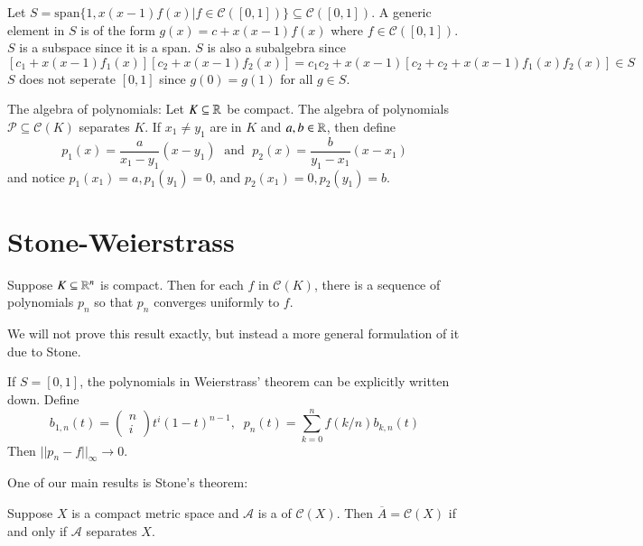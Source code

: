 \begin{example}
    Let $S = \text{span}\{1,x(x-1)f(x)\vert f \in \mathcal{C}([0,1])\}\subseteq \mathcal{C}([0,1])$. A generic element in $S$ is of the form $g(x) = c+x(x-1)f(x)$ where $f \in \mathcal{C}([0,1])$. $S$ is a subspace since it is a span. $S$ is also a subalgebra since $$[c_1+x(x-1)f_1(x)][c_2+x(x-1)f_2(x)] = c_1c_2 + x(x-1)[c_2+c_2+x(x-1)f_1(x)f_2(x)] \in S$$ $S$ does not seperate $[0,1]$ since $g(0) = g(1)$ for all $g \in S$.
\end{example}

\begin{example}
    The algebra of polynomials: Let $K \subseteq \mathbb R$ be compact. The algebra of polynomials $\mathcal{P} \subseteq \mathcal{C}(K)$ separates $K$. If $x_1 \neq y_1$ are in $K$ and $a,b \in \mathbb R$, then define $$p_1(x) = \frac{a}{x_1-y_1}(x-y_1)\;\text{ and }\;p_2(x) = \frac{b}{y_1-x_1}(x-x_1)$$ and notice $p_1(x_1) = a, p_1(y_1) = 0$, and $p_2(x_1) = 0, p_2(y_1) = b$.
\end{example}

\section{Stone-Weierstrass}

\begin{theorem}[Weierstrass 1885]
    Suppose $K \subseteq \mathbb R^n$ is compact. Then for each $f$ in $\mathcal{C}(K)$, there is a sequence of polynomials $p_n$ so that $p_n$ converges uniformly to $f$.
\end{theorem}

We will not prove this result exactly, but instead a more general formulation of it due to Stone.

\begin{example}
    If $S = [0,1]$, the polynomials in Weierstrass' theorem can be explicitly written down. Define $$b_{1,n}(t) = \left(\begin{array}{c} n\\ i\end{array}\right)t^i(1-t)^{n-1},\;\;p_n(t) = \sum_{k=0}^nf(k/n)b_{k,n}(t)$$ Then $||p_n-f||_{\infty}\rightarrow 0$.
\end{example}

One of our main results is Stone's theorem:

\begin{theorem}[Stone 1941]
    Suppose $X$ is a compact metric space and $\mathcal{A}$ is a  of $\mathcal{C}(X)$. Then $\overline{A}=\mathcal{C}(X)$ if and only if $\mathcal{A}$ separates $X$.
\end{theorem}

